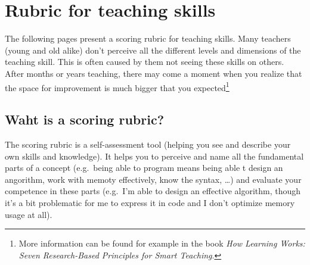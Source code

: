 
\newcommand{\rubriccriterion}[4]{
\stepcounter{rubricquestion}
\section*{\therubricquestion: #1}

\smallskip
\note{Unaware:} #2

\note{Beginner:} #3

\note{Guru:} #4

\medskip
\begin{tikzpicture}
\draw (0,0) -- (8,0);
\foreach \i in {0,1,...,8} %
{
\fill[black] (\i,0) circle (1.5 mm);
\fill[white] (\i,0) circle (1.4 mm);
}
\node at (0.15, -0.5) {unaware};
\node at (3, -0.5)    {beginner};
\node at (8, -0.5)    {guru};
\end{tikzpicture}
}

\restoregeometry
\chapter*{Rubric for teaching skills}
\label{rubric}

The following pages present a scoring rubric for teaching skills. Many teachers (young and old alike) don't perceive all the different levels and dimensions of the teaching skill. This is often caused by them not seeing these skills on others. After months or years teaching, there may come a moment when you realize that the space for improvement is much bigger that you expected\footnote{More information can be found for example in the book \emph{How Learning Works: Seven Research-Based Principles for Smart Teaching}.}

\section*{Waht is a scoring rubric?}

The scoring rubric is a self-assessment tool (helping you see and describe your own skills and knowledge).
It helps you to perceive and name all the fundamental parts of a concept (e.g.\ being able to program means being able t design an angorithm, work with memoty effectively, know the syntax, \dots) and evaluate your competence in these parts (e.g.\ I'm able to design an effective algorithm, though it's a bit problematic for me to express it in code and I don't optimize memory usage at all).

